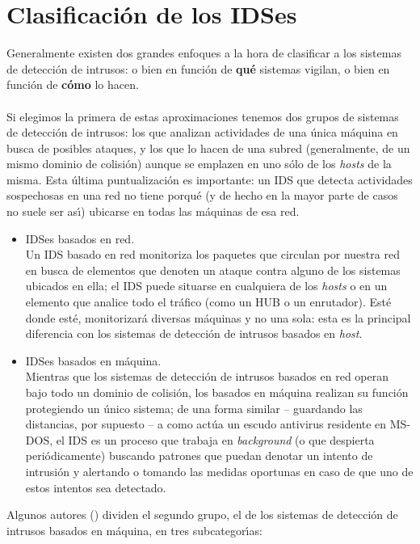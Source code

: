 \section{Clasificaci\'on de los IDSes}
Generalmente existen dos grandes enfoques a la hora de clasificar a los sistemas
de detecci\'on de intrusos: o bien en funci\'on de {\bf qu\'e} sistemas vigilan,
o bien en funci\'on de {\bf c\'omo} lo hacen.\\ 
\\Si elegimos la primera de estas aproximaciones tenemos dos grupos de sistemas
de detecci\'on de intrusos: los que analizan actividades de una \'unica 
m\'aquina en busca de posibles ataques, y los que lo hacen de una subred 
(generalmente, de un mismo dominio de colisi\'on) aunque se emplazen en uno 
s\'olo de los {\it hosts} de la misma. Esta \'ultima puntualizaci\'on es 
importante: un IDS que detecta actividades sospechosas en una red no tiene 
porqu\'e (y de hecho en la mayor parte de casos no suele ser as\'{\i}) ubicarse 
en todas las m\'aquinas de esa red.
\begin{itemize}
\item IDSes basados en red.\\
Un IDS basado en red monitoriza los paquetes que circulan por nuestra red en
busca de elementos que denoten un ataque contra alguno de los sistemas ubicados
en ella; el IDS puede situarse en cualquiera de los {\it hosts} o en un
elemento que analice todo el tr\'afico (como un HUB o un enrutador). Est\'e
donde est\'e, monitorizar\'a diversas m\'aquinas y no una sola: esta es la
principal diferencia con los sistemas de detecci\'on de intrusos basados en 
{\it host}.
\item IDSes basados en m\'aquina.\\
Mientras que los sistemas de detecci\'on de intrusos basados en red operan
bajo todo un dominio de colisi\'on, los basados en m\'aquina realizan su
funci\'on protegiendo un \'unico sistema; de una forma similar -- guardando las
distancias, por supuesto -- a como act\'ua un escudo antivirus residente en
MS-DOS, el IDS es un proceso que trabaja en {\it background} (o que despierta
peri\'odicamente) buscando patrones que puedan denotar un intento de intrusi\'on
y alertando o tomando las medidas oportunas en caso de que uno de estos 
intentos sea detectado.
\end{itemize}
Algunos autores (\cite{kn:gra00}) dividen el segundo grupo, el de los sistemas 
de detecci\'on de intrusos basados en m\'aquina, en tres subcategor\'{\i}as:

